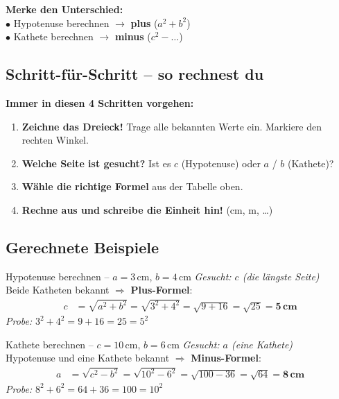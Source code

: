 \documentclass[12pt, a4paper]{article}
\begin{document}
\begin{tipbox}
\textbf{Merke den Unterschied:}\\
$\bullet$ Hypotenuse berechnen $\rightarrow$ \textbf{plus} ($a^2 + b^2$)\\
$\bullet$ Kathete berechnen $\rightarrow$ \textbf{minus} ($c^2 - \ldots$)
\end{tipbox}

\subsection{Schritt-f\"ur-Schritt -- so rechnest du}

\begin{simplebox}
\textbf{Immer in diesen 4 Schritten vorgehen:}

\vspace{0.4cm}
\begin{enumerate}[leftmargin=1.5cm, label=\textbf{Schritt \arabic*:}, itemsep=0.4cm]
  \item \textbf{Zeichne das Dreieck!} Trage alle bekannten Werte ein. Markiere den rechten Winkel.
  \item \textbf{Welche Seite ist gesucht?} Ist es $c$ (Hypotenuse) oder $a$ / $b$ (Kathete)?
  \item \textbf{W\"ahle die richtige Formel} aus der Tabelle oben.
  \item \textbf{Rechne aus und schreibe die Einheit hin!} (cm, m, \ldots)
\end{enumerate}
\end{simplebox}

\subsection{Gerechnete Beispiele}

\begin{examplebox}{Hypotenuse berechnen -- $a = 3$\,cm, $b = 4$\,cm}
\textit{Gesucht: $c$ (die l\"angste Seite)}\\[0.3cm]
Beide Katheten bekannt $\Rightarrow$ \textbf{Plus-Formel}:
\begin{align*}
  c &= \sqrt{a^2 + b^2} = \sqrt{3^2 + 4^2} = \sqrt{9 + 16} = \sqrt{25} = \mathbf{5\,cm}
\end{align*}
\textit{Probe:} $3^2 + 4^2 = 9 + 16 = 25 = 5^2$ \checkmark
\end{examplebox}

\begin{examplebox}{Kathete berechnen -- $c = 10$\,cm, $b = 6$\,cm}
\textit{Gesucht: $a$ (eine Kathete)}\\[0.3cm]
Hypotenuse und eine Kathete bekannt $\Rightarrow$ \textbf{Minus-Formel}:
\begin{align*}
  a &= \sqrt{c^2 - b^2} = \sqrt{10^2 - 6^2} = \sqrt{100 - 36} = \sqrt{64} = \mathbf{8\,cm}
\end{align*}
\textit{Probe:} $8^2 + 6^2 = 64 + 36 = 100 = 10^2$ \checkmark
\end{examplebox}
\end{document}
